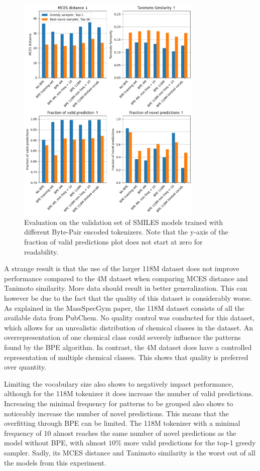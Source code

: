 \begin{figure}[h]
    \centering
    \includegraphics[width=0.79\textwidth]{figures/results/bpe_with_tanimoto.png}
    \caption{Evaluation on the validation set of SMILES models trained with different Byte-Pair encoded tokenizers.
    Note that the y-axis of the fraction of valid predictions plot does not start at zero for readability.}
    \label{fig:bpe}
\end{figure}

A strange result is that the use of the larger 118M dataset does not improve performance compared to the 4M dataset when comparing MCES distance and Tanimoto similarity.
More data should result in better generalization.
This can however be due to the fact that the quality of this dataset is considerably worse.
As explained in the MassSpecGym paper, the 118M dataset consists of all the available data from PubChem. 
No quality control was conducted for this dataset, which allows for an unrealistic distribution of chemical classes in the dataset.
An overrepresentation of one chemical class could severely influence the patterns found by the \ac{BPE} algorithm.
In contrast, the 4M dataset does have a controlled representation of multiple chemical classes.
This shows that quality is preferred over quantity.

Limiting the vocabulary size also shows to negatively impact performance, although for the 118M tokenizer it does increase the number of valid predictions.
Increasing the minimal frequency for patterns to be grouped also shows to noticeably increase the number of novel predictions.
This means that the overfitting through \ac{BPE} can be limited.
The 118M tokenizer with a minimal frequency of 10 almost reaches the same number of novel predictions as the model without \ac{BPE}, with almost $10\%$ more valid predictions for the top-1 greedy sampler.
Sadly, its MCES distance and Tanimoto similarity is the worst out of all the models from this experiment.

